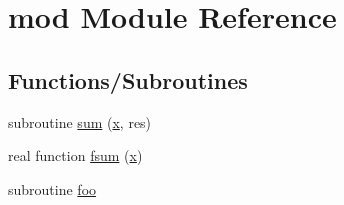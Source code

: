\hypertarget{namespacemod}{}\section{mod Module Reference}
\label{namespacemod}
\subsection*{Functions/\+Subroutines}
\begin{DoxyCompactItemize}
\item 
subroutine \hyperlink{namespacemod_a4df844757a1ca6f044e63c1312516b93}{sum} (\hyperlink{namespacemod_ac711af5fe944dbb95690bef3ed0da8c4}{x}, res)
\item 
real function \hyperlink{namespacemod_a9aceda52f5106b41e537f39657d081ed}{fsum} (\hyperlink{namespacemod_ac711af5fe944dbb95690bef3ed0da8c4}{x})
\item 
subroutine \hyperlink{namespacemod_aecf9fac458f0baf96a355cf347730783}{foo}
\end{DoxyCompactItemize}
